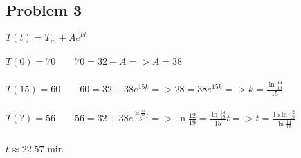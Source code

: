 \documentclass[12pt]{exam}
\begin{document}
\subsection*{Problem 3}
$T(t)=T_m+Ae^{kt}$\\\\
$T(0)=70\qquad70=32+A=>A=38$\\\\
$T(15)=60\qquad60=32+38e^{15k}=>28=38e^{15k}=>k=\frac{\ln{\frac{14}{19}}}{15}$\\\\
$T(?)=56\qquad56=32+38e^{\frac{\ln{\frac{14}{19}}}{15}t}=>\ln{\frac{12}{19}}=\frac{\ln{\frac{14}{19}}}{15}t=>t=\frac{15\ln{\frac{12}{19}}}{\ln{\frac{14}{19}}}$\\\\
$t\approx22.57$ min
\end{document}
